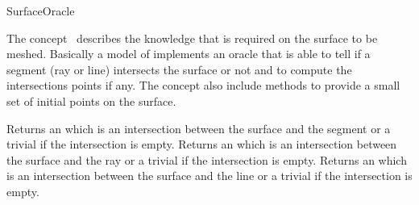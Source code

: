 

\begin{ccRefConcept}{SurfaceOracle}


\ccDefinition
  
The concept \ccRefName\ describes the knowledge that is required on the
surface to be meshed. Basically a model of \ccRefName
implements an oracle that is able to tell if a segment
(ray or line) intersects the surface or not
and to compute the intersections
points if any. The concept \ccRefName also include methods  to provide
a small set of initial points on the surface.


\ccTypes




\ccCreation
{}  %


\ccOperations


{ Returns an   which is an intersection 
between the surface and the segment  or
a trivial  if the intersection is empty.}
\ccGlue
{}
{ Returns an   which is an intersection 
between the surface and the ray  or
a trivial  if the intersection is empty.}
\ccGlue
{}
{ Returns an   which is an intersection 
between the surface and the line  or
a trivial  if the intersection is empty.}


\end{ccRefConcept}
